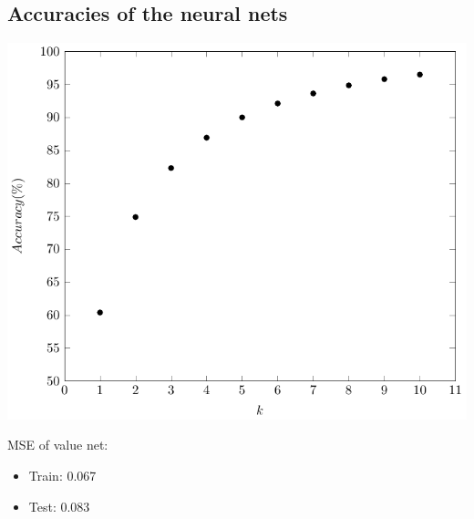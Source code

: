 \documentclass[a0,portrait]{a0poster}
\begin{document}
\begin{multicols}{3}
\subsection*{Accuracies of the neural nets}
\begin{minipage}{0.7\linewidth}
\begin{center}
\includegraphics[width=0.7\linewidth]{topk.pdf}
\end{center}
\end{minipage}%
\begin{minipage}{0.3\linewidth}
{ \color{Green}
MSE of value net:
\begin{itemize}
\item Train: 0.067
\item Test: 0.083
\end{itemize}
}
\vspace{8cm}
\end{minipage}


\end{multicols}
\end{document}
